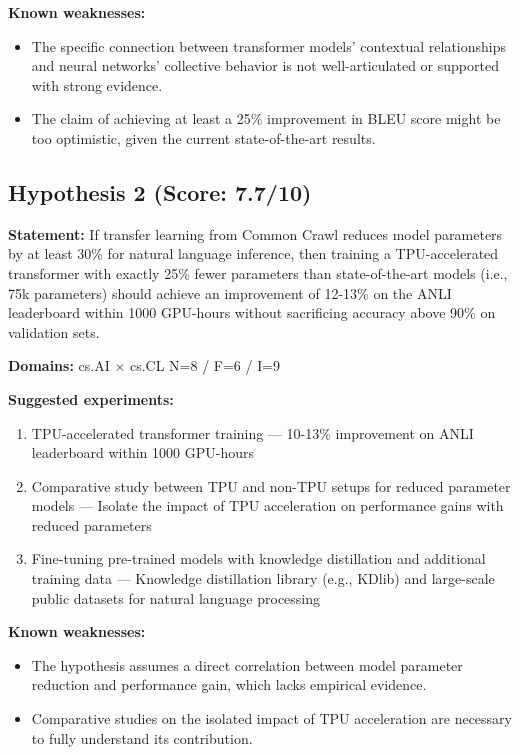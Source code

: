 \documentclass[12pt,a4paper]{article}
\begin{document}
\textbf{Known weaknesses:}
\begin{itemize}
  \item The specific connection between transformer models' contextual relationships and neural networks' collective behavior is not well-articulated or supported with strong evidence.
  \item The claim of achieving at least a 25\% improvement in BLEU score might be too optimistic, given the current state-of-the-art results.
\end{itemize}
\subsection*{Hypothesis 2 (Score: 7.7/10)}

\textbf{Statement:} If transfer learning from Common Crawl reduces model parameters by at least 30\% for natural language inference, then training a TPU-accelerated transformer with exactly 25\% fewer parameters than state-of-the-art models (i.e., 75k parameters) should achieve an improvement of 12-13\% on the ANLI leaderboard within 1000 GPU-hours without sacrificing accuracy above 90\% on validation sets.

\noindent\textbf{Domains:} cs.AI $\times$ cs.CL
\hspace{1em} N=8 / F=6 / I=9

\textbf{Suggested experiments:}
\begin{enumerate}
  \item TPU-accelerated transformer training — 10-13\% improvement on ANLI leaderboard within 1000 GPU-hours
  \item Comparative study between TPU and non-TPU setups for reduced parameter models — Isolate the impact of TPU acceleration on performance gains with reduced parameters
  \item Fine-tuning pre-trained models with knowledge distillation and additional training data — Knowledge distillation library (e.g., KDlib) and large-scale public datasets for natural language processing
\end{enumerate}

\textbf{Known weaknesses:}
\begin{itemize}
  \item The hypothesis assumes a direct correlation between model parameter reduction and performance gain, which lacks empirical evidence.
  \item Comparative studies on the isolated impact of TPU acceleration are necessary to fully understand its contribution.
\end{itemize}
\end{document}
